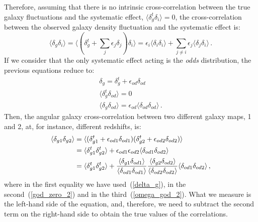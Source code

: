 Therefore, assuming that there is no intrinsic cross-correlation between the true galaxy fluctuations and the systematic effect, $\langle \delta^t_g \delta_i \rangle = 0$, the cross-correlation between the observed galaxy density fluctuation and the systematic effect is:
\begin{equation}
\langle \delta_g \delta_i \rangle = \langle (\delta^t_g+\sum_{j}\epsilon_j \delta_j) \delta_i \rangle = \epsilon_i \langle \delta_i \delta_i \rangle + \sum_{j\neq i}\epsilon_j\langle \delta_j \delta_i \rangle \label{omega_god} \, .
\end{equation}
If we consider that the only systematic effect acting is the \textit{odds} distribution, the previous equations reduce to:
\begin{eqnarray}
\delta_g = \delta^t_g+\epsilon_{od} \delta_{od} \label{delta_g} \\
\langle \delta^t_g \delta_{od} \rangle = 0 \label{god_zero_2} \\
\langle \delta_g \delta_{od} \rangle = \epsilon_{od}\langle \delta_{od} \delta_{od} \rangle \label{omega_god_2} \, .
\end{eqnarray}
Then, the angular galaxy cross-correlation between two different galaxy maps, 1 and 2, at, for instance, different redshifts, is:
\begin{align}
\langle \delta_{g1} \delta_{g2} \rangle &= \langle (\delta^t_{g1}+\epsilon_{od1} \delta_{od1}) (\delta^t_{g2}+\epsilon_{od2} \delta_{od2}) \rangle \nonumber \\
&= \langle \delta^t_{g1} \delta^t_{g2} \rangle + \epsilon_{od1} \epsilon_{od2} \langle \delta_{od1} \delta_{od2} \rangle \nonumber \\ 
&= \langle \delta^t_{g1} \delta^t_{g2} \rangle + {\langle \delta_{g1} \delta_{od1} \rangle \over \langle \delta_{od1} \delta_{od1} \rangle }{ \langle \delta_{g2} \delta_{od2} \rangle \over \langle \delta_{od2} \delta_{od2} \rangle} \langle \delta_{od1} \delta_{od2} \rangle \, ,
\end{align}
where in the first equality we have used~(\ref{delta_g}), in the second~(\ref{god_zero_2}) and in the third~(\ref{omega_god_2}). What we measure is the left-hand side of the equation, and, therefore, we need to subtract the second term on the right-hand side to obtain the true values of the correlations. 

